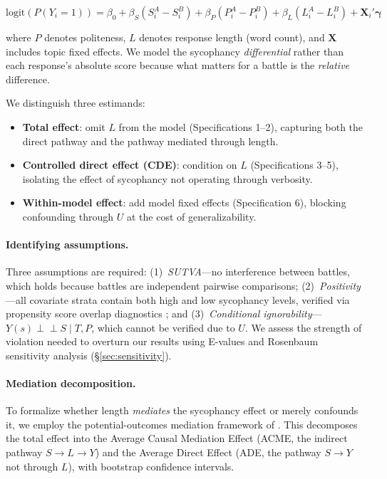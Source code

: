 \documentclass[11pt,twocolumn,a4paper]{article}
\begin{document}
\begin{equation}
  \label{eq:logit}
  \text{logit}\!\left(P(Y_i = 1)\right) =
    \beta_0
    + \beta_S \left(S_i^A - S_i^B\right)
    + \beta_P \left(P_i^A - P_i^B\right)
    + \beta_L \left(L_i^A - L_i^B\right)
    + \mathbf{X}_i'\boldsymbol{\gamma}
\end{equation}

\noindent where $P$ denotes politeness, $L$ denotes response length
(word count), and $\mathbf{X}$ includes topic fixed effects. We model
the sycophancy \emph{differential} rather than each response's absolute
score because what matters for a battle is the \emph{relative} difference.

We distinguish three estimands:
\begin{itemize}
  \item \textbf{Total effect}: omit $L$ from the model (Specifications 1--2),
    capturing both the direct pathway and the pathway mediated through length.
  \item \textbf{Controlled direct effect (CDE)}: condition on $L$
    (Specifications 3--5), isolating the effect of sycophancy not
    operating through verbosity.
  \item \textbf{Within-model effect}: add model fixed effects
    (Specification 6), blocking confounding through $U$ at the cost
    of generalizability.
\end{itemize}

\paragraph{Identifying assumptions.} Three assumptions are required:
(1)~\emph{SUTVA}---no interference between battles, which holds because
battles are independent pairwise comparisons;
(2)~\emph{Positivity}---all covariate strata contain both high and low
sycophancy levels, verified via propensity score overlap diagnostics
\citep{rosenbaum1983central}; and
(3)~\emph{Conditional ignorability}---$Y(s) \perp\!\!\!\perp S \mid T,P$,
which cannot be verified due to $U$. We assess the strength of
violation needed to overturn our results using E-values and Rosenbaum
sensitivity analysis (\S\ref{sec:sensitivity}).

\paragraph{Mediation decomposition.} To formalize whether length
\emph{mediates} the sycophancy effect or merely confounds it, we employ
the potential-outcomes mediation framework of \citet{imai2010general}.
This decomposes the total effect into the Average Causal Mediation
Effect (ACME, the indirect pathway $S \to L \to Y$) and the Average
Direct Effect (ADE, the pathway $S \to Y$ not through $L$), with
bootstrap confidence intervals.
\end{document}
